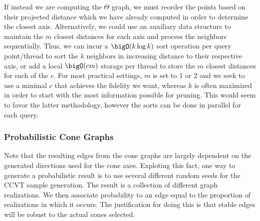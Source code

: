 If instead we are computing the $\Theta$ graph, we must reorder the points based on their projected distance which we have already computed in order to determine the closest axis.
%
Alternatively, we could use an auxiliary data structure to maintain the $m$ closest distances for each axis and process the neighbors sequentially.
%
Thus, we can incur a $\bigO(k \log k)$ sort operation per query point/thread to sort the $k$ neighbors in increasing distance to their respective axis, or add a local $\bigO(cm)$ storage per thread to store the $m$ closest distances for each of the $c$.
%
For most practical settings, $m$ is set to 1 or 2 and we seek to use a minimal $c$ that achieves the fidelity we want, whereas $k$ is often maximized in order to start with the most information possible for pruning.
%
This would seem to favor the latter methodology, however the sorts can be done in parallel for each query.
%

\subsubsection{Probabilistic Cone Graphs}
\label{sec:probabilistic_cones}

Note that the resulting edges from the cone graphs are largely dependent on the generated directions used for the cone axes.
%
Exploting this fact, one way to generate a probabilistic result is to use several different random seeds for the CCVT sample generation.
%
The result is a collection of different graph realizations.
%
We then associate probability to an edge equal to the proportion of realizations in which it occurs.
%
The justification for doing this is that stable edges will be robust to the actual cones selected.


